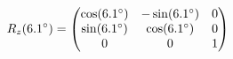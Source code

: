 \documentclass[preview]{standalone}
\begin{document}
\begin{align*}
\special{dvisvgm:raw <g id='unique000'>}R_z(6.1^\circ) = \begin{pmatrix} \cos(6.1^\circ) & -\sin(6.1^\circ) & 0 \\ \sin(6.1^\circ) & \cos(6.1^\circ) & 0 \\ 0 & 0 & 1 \end{pmatrix}\special{dvisvgm:raw </g>}
\end{align*}
\end{document}
